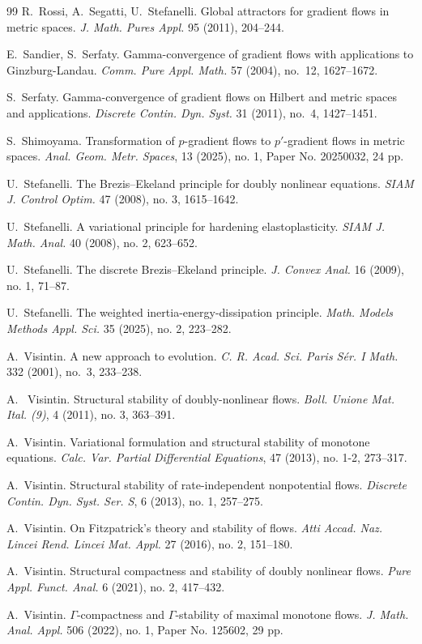 \documentclass[reqno]{amsart}
\begin{document}
\begin{thebibliography}{99}
R.~Rossi, A.~Segatti, U.~Stefanelli.
Global attractors for gradient flows in metric spaces.
{\it J. Math. Pures Appl.} 95 (2011), 204--244.

E.~Sandier, S.~Serfaty. Gamma-convergence of gradient flows with
  applications to {G}inzburg-{L}andau. {\it  Comm. Pure Appl. Math.} 57 (2004), no.~12,
  1627--1672.
  
S.~Serfaty. Gamma-convergence of gradient flows on Hilbert and metric
spaces and applications. {\it Discrete Contin. Dyn. Syst.} 31 (2011), no.~4,
1427--1451.

  S.~Shimoyama. Transformation of $p$-gradient flows to $p'$-gradient
  flows in metric spaces. {\it Anal. Geom. Metr. Spaces}, 13 (2025), no. 1,
  Paper No. 20250032, 24 pp.

  U.~Stefanelli. The Brezis--Ekeland principle for doubly nonlinear
  equations. {\it SIAM J. Control Optim.} 47 (2008), no. 3,
  1615--1642.
 
  U.~Stefanelli.  A variational principle for hardening
  elastoplasticity. {\it SIAM J. Math. Anal.} 40 (2008), no. 2, 623--652.
  
U.~Stefanelli. The discrete Brezis--Ekeland principle. {\it J. Convex Anal.} 16 (2009), no. 1, 71--87. 

U.~Stefanelli. The weighted inertia-energy-dissipation principle. {\it
  Math. Models Methods Appl. Sci.} 35 (2025), no. 2, 223--282.

{A.~Visintin}. {A new approach to
  evolution}. {\it C. R. Acad. Sci. Paris S\'er. I Math.} 332 (2001), no.~3, 233--238.

A.~ Visintin. Structural stability of doubly-nonlinear flows. {\it Boll. Unione Mat. Ital. (9)}, 4 (2011), no. 3, 363--391.

A.~Visintin. Variational formulation and structural stability
of monotone equations. {\it Calc. Var. Partial Differential
  Equations}, 47 (2013), no. 1-2, 273--317.

A.~Visintin.  Structural stability of rate-independent nonpotential
flows. {\it Discrete Contin. Dyn. Syst. Ser. S}, 6 (2013), no. 1, 257--275.

A.~Visintin. On Fitzpatrick's theory and stability of flows. {\it Atti
  Accad. Naz. Lincei Rend. Lincei Mat. Appl.} 27 (2016), no. 2,
151--180.

A.~Visintin. Structural compactness and stability of doubly nonlinear
flows. {\it Pure Appl. Funct. Anal.} 6 (2021), no. 2, 417--432.

 A.~Visintin. $\Gamma$-compactness and $\Gamma$-stability of maximal monotone
  flows. {\it J. Math. Anal. Appl.} 506 (2022), no. 1, Paper No. 125602, 29
  pp.

\end{thebibliography}
\end{document}
